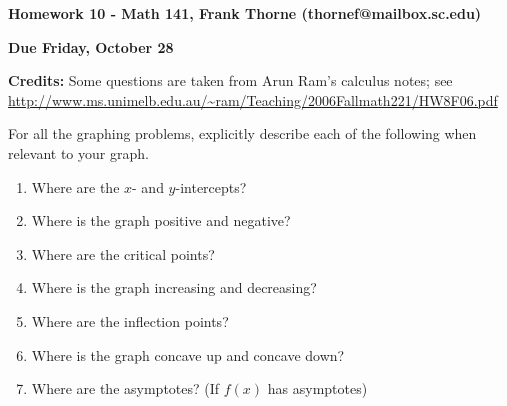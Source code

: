 \documentclass[12pt]{article}
\begin{document}
\setlength{\topmargin}{-2mm}





\begin{center}{\bf Homework 10 - Math 141, Frank Thorne (thornef@mailbox.sc.edu)}
\end{center}
\begin{center}
{\bf Due Friday, October 28}
\end{center}

{\bf Credits:} Some questions are taken from Arun Ram's calculus notes; see
\url{http://www.ms.unimelb.edu.au/~ram/Teaching/2006Fallmath221/HW8F06.pdf}

For all the graphing problems, explicitly describe each of the following when relevant
to your graph.

\begin{enumerate}[(1)]
\item
Where are the $x$- and $y$-intercepts?

\item
Where is the graph positive and negative?

\item
Where are the critical points?

\item
Where is the graph increasing and decreasing?

\item
Where are the inflection points?

\item
Where is the graph concave up and concave down?

\item
Where are the asymptotes? (If $f(x)$ has asymptotes)
\end{enumerate}
\end{document}

